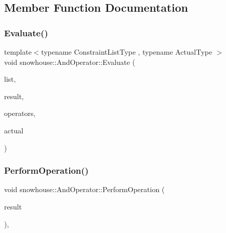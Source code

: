 \subsection{Member Function Documentation}
\mbox{\label{structsnowhouse_1_1AndOperator_aed6692968d499216d8bcb8fdbb48445a}} 
\subsubsection{\texorpdfstring{Evaluate()}{Evaluate()}}
{\footnotesize\ttfamily template$<$typename Constraint\+List\+Type , typename Actual\+Type $>$ \\
void snowhouse\+::\+And\+Operator\+::\+Evaluate (\begin{DoxyParamCaption}\item[{Constraint\+List\+Type \&}]{list,  }\item[{\mbox{\hyperlink{namespacesnowhouse_a719169b1315a13161c15f25e600a8f51}{Result\+Stack}} \&}]{result,  }\item[{\mbox{\hyperlink{namespacesnowhouse_adcb10e215e6a4bbcb35722a9c7270fc6}{Operator\+Stack}} \&}]{operators,  }\item[{const Actual\+Type \&}]{actual }\end{DoxyParamCaption})\hspace{0.3cm}{\ttfamily [inline]}}

\mbox{\label{structsnowhouse_1_1AndOperator_a59f6a119b0a03df13f7bb99b8fd8ecf9}} 
\subsubsection{\texorpdfstring{PerformOperation()}{PerformOperation()}}
{\footnotesize\ttfamily void snowhouse\+::\+And\+Operator\+::\+Perform\+Operation (\begin{DoxyParamCaption}\item[{\mbox{\hyperlink{namespacesnowhouse_a719169b1315a13161c15f25e600a8f51}{Result\+Stack}} \&}]{result }\end{DoxyParamCaption})\hspace{0.3cm}{\ttfamily [inline]}, {\ttfamily [virtual]}}



